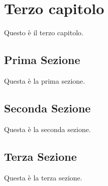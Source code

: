 \clearpage{\pagestyle{empty}\cleardoublepage}
\chapter{Terzo capitolo}                %

Questo \`e il terzo capitolo.

\section{Prima Sezione}                 %
Questa \`e la prima sezione.

\newpage

\section{Seconda Sezione}                 %
Questa \`e la seconda sezione.

\newpage

\section{Terza Sezione}                 %
Questa \`e la terza sezione.

